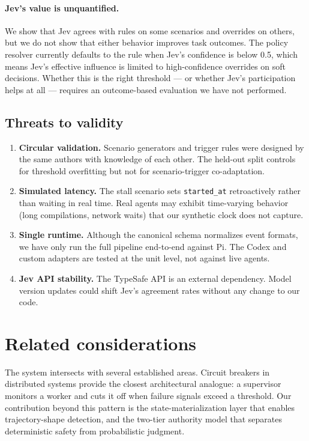 \documentclass[11pt,a4paper]{article}
\begin{document}
\paragraph{Jev's value is unquantified.} We show that Jev agrees with rules on some scenarios and overrides on others, but we do not show that either behavior improves task outcomes. The policy resolver currently defaults to the rule when Jev's confidence is below 0.5, which means Jev's effective influence is limited to high-confidence overrides on soft decisions. Whether this is the right threshold --- or whether Jev's participation helps at all --- requires an outcome-based evaluation we have not performed.

\subsection{Threats to validity}

\begin{enumerate}
\item \textbf{Circular validation.} Scenario generators and trigger rules were designed by the same authors with knowledge of each other. The held-out split controls for threshold overfitting but not for scenario-trigger co-adaptation.

\item \textbf{Simulated latency.} The stall scenario sets \texttt{started\_at} retroactively rather than waiting in real time. Real agents may exhibit time-varying behavior (long compilations, network waits) that our synthetic clock does not capture.

\item \textbf{Single runtime.} Although the canonical schema normalizes event formats, we have only run the full pipeline end-to-end against Pi. The Codex and custom adapters are tested at the unit level, not against live agents.

\item \textbf{Jev API stability.} The TypeSafe API is an external dependency. Model version updates could shift Jev's agreement rates without any change to our code.
\end{enumerate}

\section{Related considerations}

The system intersects with several established areas. Circuit breakers in distributed systems provide the closest architectural analogue: a supervisor monitors a worker and cuts it off when failure signals exceed a threshold. Our contribution beyond this pattern is the state-materialization layer that enables trajectory-shape detection, and the two-tier authority model that separates deterministic safety from probabilistic judgment.
\end{document}
